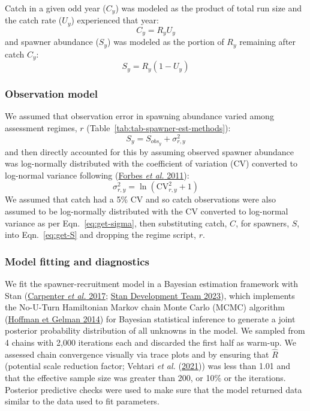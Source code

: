 \documentclass[french,11pt]{book}
\begin{document}
Catch in a given odd year (\(C_y\)) was modeled as the product of total run size and the catch rate (\(U_y\)) experienced that year:
\begin{equation}
 C_y = R_y U_y
\label{eq:harvest}
\end{equation}
and spawner abundance (\(S_y\)) was modeled as the portion of \(R_y\) remaining after catch \(C_y\):
\begin{equation}
S_y = R_y (1 - U_y)
\label{eq:get-S}
\end{equation}
\hypertarget{observation-model}{%
\subsubsection{Observation model}\label{observation-model}}

We assumed that observation error in spawning abundance varied among assessment regimes, \(r\) (Table~\ref{tab:tab-spawner-est-methods}):
\begin{equation}
S_y = S_{obs_y} + \sigma^2_{r,y}
\label{eq:get-S}
\end{equation}
and then directly accounted for this by assuming observed spawner abundance was log-normally distributed with the coefficient of variation (CV) converted to log-normal variance following (\protect\hyperlink{ref-forbes_statistical_2011}{Forbes \emph{et al.} 2011}):
\begin{equation}
\sigma^2_{r,y} = \ln\left(\mathrm{CV}_{r,y}^2 + 1\right)
\label{eq:get-sigma}
\end{equation}
We assumed that catch had a 5\% CV and so catch observations were also assumed to be log-normally distributed with the CV converted to log-normal variance as per Eqn.~\ref{eq:get-sigma}, then substituting catch, \(C\), for spawners, \(S\), into Eqn.~\ref{eq:get-S} and dropping the regime script, \(r\).

\hypertarget{model-fitting-and-diagnostics}{%
\subsubsection{Model fitting and diagnostics}\label{model-fitting-and-diagnostics}}

We fit the spawner-recruitment model in a Bayesian estimation framework with Stan (\protect\hyperlink{ref-carpenter_stan_2017}{Carpenter \emph{et al.} 2017}; \protect\hyperlink{ref-standevelopmentteamRstanInterfaceStan2023}{Stan Development Team 2023}), which implements the No-U-Turn Hamiltonian Markov chain Monte Carlo (MCMC) algorithm (\protect\hyperlink{ref-hoffman2014}{Hoffman et Gelman 2014}) for Bayesian statistical inference to generate a joint posterior probability distribution of all unknowns in the model. We sampled from 4 chains with 2,000 iterations each and discarded the first half as warm-up. We assessed chain convergence visually via trace plots and by ensuring that \(\hat{R}\) (potential scale reduction factor; Vehtari \emph{et al.} (\protect\hyperlink{ref-vehtari2021rank}{2021})) was less than 1.01 and that the effective sample size was greater than 200, or 10\% or the iterations. Posterior predictive checks were used to make sure that the model returned data similar to the data used to fit parameters.
\end{document}
